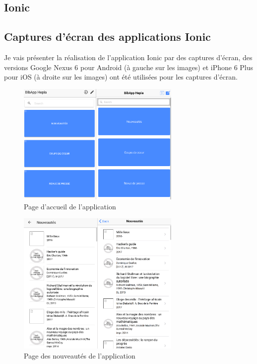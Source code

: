 \documentclass[a4paper, 12pt]{article}
\begin{document}
\subsection{Ionic}


\subsection{Captures d'écran des applications Ionic}
Je vais présenter la réalisation de l'application Ionic par des captures d'écran, des versions Google Nexus 6 
pour Android (à gauche sur les images) et iPhone 6 Plus pour iOS (à droite sur les images) ont été utilisées pour les 
captures d'écran.
\begin{figure}
    \begin{center}
        \includegraphics[width=0.7\textwidth]{images/screenshots/android_iphone_1.png}
    \end{center}
    \caption{Page d'accueil de l'application}
\end{figure}
\begin{figure}
    \begin{center}
        \includegraphics[width=0.7\textwidth]{images/screenshots/android_iphone_2.png}
    \end{center}
    \caption{Page des nouveautés de l'application}
\end{figure}
\end{document}
